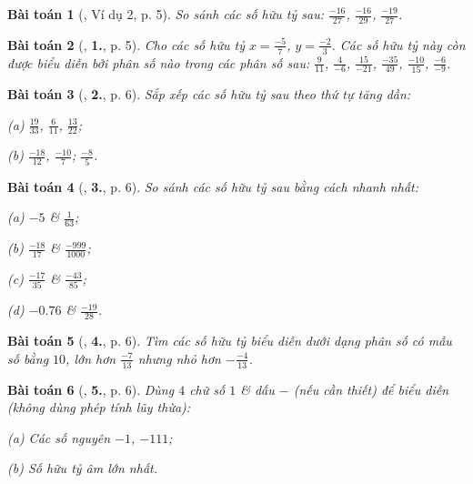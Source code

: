\documentclass{article}
\numberwithin{equation}{section}
\newtheorem{baitoan}{Bài toán}[section]
\begin{document}
\begin{baitoan}[\cite{Tuyen_Toan_7}, Ví dụ 2, p. 5]
	So sánh các số hữu tỷ sau: $\frac{-16}{27}$, $\frac{-16}{29}$, $\frac{-19}{27}$.
\end{baitoan}

\begin{baitoan}[\cite{Tuyen_Toan_7}, \textbf{1.}, p. 5]
	Cho các số hữu tỷ $x = \frac{-5}{7}$, $y = \frac{-2}{3}$. Các số hữu tỷ này còn được biểu diễn bởi phân số nào trong các phân số sau: $\frac{9}{11}$, $\frac{4}{-6}$, $\frac{15}{-21}$, $\frac{-35}{49}$, $\frac{-10}{15}$, $\frac{-6}{-9}$.
\end{baitoan}

\begin{baitoan}[\cite{Tuyen_Toan_7}, \textbf{2.}, p. 6]
	Sắp xếp các số hữu tỷ sau theo thứ tự tăng dần:
	\begin{enumerate*}
		\item[(a)] $\frac{19}{33}$, $\frac{6}{11}$, $\frac{13}{22}$;
		\item[(b)] $\frac{-18}{12}$, $\frac{-10}{7}$; $\frac{-8}{5}$.
	\end{enumerate*}
\end{baitoan}

\begin{baitoan}[\cite{Tuyen_Toan_7}, \textbf{3.}, p. 6]
	So sánh các số hữu tỷ sau bằng cách nhanh nhất:
	\begin{enumerate*}
		\item[(a)] $-5$ \& $\frac{1}{63}$;
		\item[(b)] $\frac{-18}{17}$ \& $\frac{-999}{1000}$;
		\item[(c)] $\frac{-17}{35}$ \& $\frac{-43}{85}$;
		\item[(d)] $-0.76$ \& $\frac{-19}{28}$.
	\end{enumerate*}
\end{baitoan}

\begin{baitoan}[\cite{Tuyen_Toan_7}, \textbf{4.}, p. 6]
	Tìm các số hữu tỷ biểu diễn dưới dạng phân số có mẫu số bằng $10$, lớn hơn $\frac{-7}{13}$ nhưng nhỏ hơn $-\frac{-4}{13}$.
\end{baitoan}

\begin{baitoan}[\cite{Tuyen_Toan_7}, \textbf{5.}, p. 6]
	Dùng $4$ chữ số $1$ \& dấu $-$ (nếu cần thiết) để biểu diễn (không dùng phép tính lũy thừa):
	\begin{enumerate*}
		\item[(a)] Các số nguyên $-1$, $-111$;
		\item[(b)] Số hữu tỷ âm lớn nhất.
	\end{enumerate*}
\end{baitoan}
\end{document}
